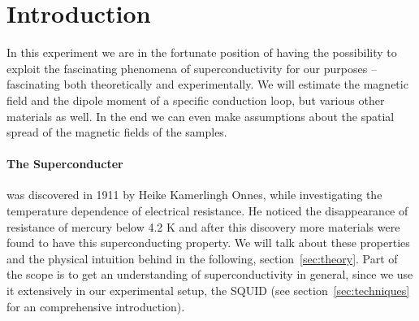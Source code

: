 \section{Introduction}
In this experiment we are in the fortunate position of having the 
possibility to exploit the fascinating phenomena of superconductivity for
our purposes -- fascinating both theoretically and experimentally. We will
estimate the magnetic field and the dipole moment of a specific conduction loop,
but various other materials as well. In the end we can even make assumptions
about the spatial spread of the magnetic fields of the samples.
\paragraph{The Superconducter} 
was discovered in 1911 by Heike Kamerlingh Onnes, while
investigating the temperature dependence of electrical resistance.
He noticed the disappearance of resistance of mercury below 4.2 K and
after this discovery more materials were found to have this
superconducting property. We will talk about these properties and the
physical intuition behind in the following, section~\ref{sec:theory}.
Part of the scope is 
to get an understanding of superconductivity in general, since we use it
extensively in our experimental setup, the SQUID 
(see section~\ref{sec:techniques} for an comprehensive introduction).


